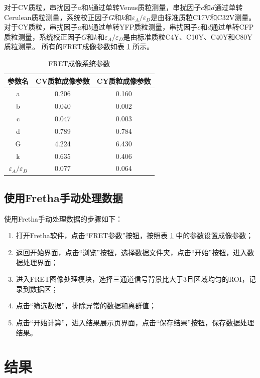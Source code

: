 对于CV质粒，串扰因子$a$和$b$通过单转Venus质粒测量，串扰因子$c$和$d$通过单转Cerulean质粒测量，系统校正因子$G$和$k$和$\varepsilon_{A}/\varepsilon_{D}$是由标准质粒C17V和C32V测量。
对于CY质粒，串扰因子$a$和$b$通过单转YFP质粒测量，串扰因子$c$和$d$通过单转CFP质粒测量，系统校正因子$G$和$k$和$\varepsilon_{A}/\varepsilon_{D}$是由标准质粒C4Y、C10Y、C40Y和C80Y质粒测量。
所有的FRET成像参数如表 \ref{tab:lurs_imaging_params} 所示。

\begin{table}[htbp]
    \centering
    \caption{FRET成像系统参数}
    \begin{tabular}{ccc}
        \toprule[1.5pt]
        参数名 & CV质粒成像参数 & CY质粒成像参数 \\
        \midrule
        a & 0.206 & 0.160\\
        b & 0.040 & 0.002\\
        c & 0.047 & 0.003\\
        d & 0.789 & 0.784\\
        G & 4.224 & 6.430\\
        k & 0.635 & 0.406\\
        $\varepsilon_{A}/\varepsilon_{D}$ & 0.077 & 0.064\\
        \bottomrule[1.5pt]
    \end{tabular}
    \label{tab:lurs_imaging_params}
\end{table}
\fi

\subsection{使用Fretha手动处理数据}
\label{sec:Fretha手动处理数据}
使用Fretha手动处理数据的步骤如下：
\begin{enumerate}
  \item 打开Fretha软件，点击“FRET参数”按钮，按照表 \ref{tab:lurs_imaging_params} 中的参数设置成像参数；
  \item 返回开始界面，点击“浏览”按钮，选择数据文件夹，点击“开始”按钮，进入数据处理界面；
  \item 进入FRET图像处理模块，选择三通道信号背景比大于3且区域均匀的ROI，记录到数据区；
  \item 点击“筛选数据”，排除异常的数据和离群值；
  \item 点击“开始计算”，进入结果展示页界面，点击“保存结果”按钮，保存数据处理结果。
\end{enumerate}

\section{结果}

